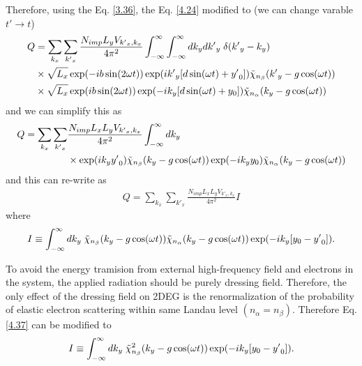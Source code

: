 \noindent
Therefore, using the Eq. \eqref{3.36}, the Eq. \eqref{4.24} modified to (we can change varable $t' \rightarrow t$)
\begin{equation} \label{4.34}
  \begin{aligned}
    Q & =
    \sum_{k_x}\sum_{{k'}_x}
    \frac{N_{imp} L_y V_{{k'}_x,k_x}}{4\pi^2}
    \int_{-\infty}^{\infty} \int_{-\infty}^{\infty} dk_y d{k'}_y \;
    \delta({k'}_y - k_y)
    \\
    & \times
    \sqrt{L_x}
    \exp(
      -ib\sin(2\omega t)
    )
    \exp(
      i{k'}_y  \qty[d\sin(\omega t) + {y'}_0]
    )
    \tilde{\chi}_{n_{\beta}}\qty({k'}_y -g\cos(\omega t))
    \\
    & \times
    \sqrt{L_x}
    \exp(
      ib\sin(2\omega t)
    )
    \exp(
      -ik_y  \qty[d\sin(\omega t) + y_0]
    )
    \tilde{\chi}_{n_{\alpha}}\qty(k_y -g\cos(\omega t))
  \end{aligned}
\end{equation}
and we can simplify this as
\begin{equation} \label{4.35}
  \begin{aligned}
    Q =
    \sum_{k_x}\sum_{{k'}_x} &
    \frac{N_{imp} L_xL_y V_{{k'}_x,k_x}}{4\pi^2}
    \int_{-\infty}^{\infty} dk_y \;
    \\
    & \times
    \exp(
      i{k}_y {y'}_0
    )
    \tilde{\chi}_{n_{\beta}}\qty({k}_y -g\cos(\omega t))
    \exp(
      -ik_y y_0
    )
    \tilde{\chi}_{n_{\alpha}}\qty(k_y -g\cos(\omega t))
  \end{aligned}
\end{equation}
and this can re-write as
\begin{equation} \label{4.36}
  \begin{aligned}
    Q =
    \sum_{k_x}\sum_{{k'}_x}
    \frac{N_{imp} L_xL_y V_{{k'}_x,k_x}}{4\pi^2} I
  \end{aligned}
\end{equation}
where
\begin{equation} \label{4.37}
  \begin{aligned}
    I \equiv
    \int_{-\infty}^{\infty} dk_y \;
    \tilde{\chi}_{n_{\beta}}\qty(k_y -g\cos(\omega t))
    \tilde{\chi}_{n_{\alpha}}\qty(k_y -g\cos(\omega t))
    \exp(
      -ik_y  \qty[y_0 - {y'}_0  ]
    ).
  \end{aligned}
\end{equation}

\noindent
To avoid the energy tramision from external high-frequency field and electrons in the system, the applied radiation should be purely dressing field. Therefore, the only effect of the dressing field on 2DEG is the renormalization of the probability of elastic electron scattering within same Landau level $(n_{\alpha} = n_{\beta})$. Therefore Eq. \eqref{4.37} can be modified to
\begin{equation} \label{4.38}
  \begin{aligned}
    I \equiv
    \int_{-\infty}^{\infty} dk_y \;
    \tilde{\chi}_{n_{\beta}}^2 \qty(k_y -g\cos(\omega t))
    \exp(
      -ik_y  \qty[y_0 - {y'}_0  ]
    ).
  \end{aligned}
\end{equation}

